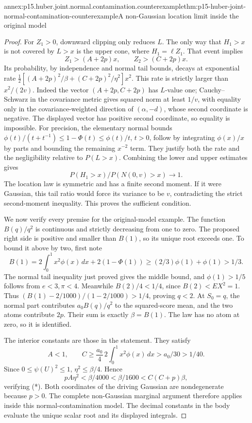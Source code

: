 \begin{annexitem}{annex:p15.huber.joint.normal.contamination.counterexample}{thm:p15-huber-joint-normal-contamination-counterexample}{A non-Gaussian location limit inside the original model}
\begin{proof}
For \(Z_1>0\), downward clipping only reduces \(L\).
The only way that \(H_1>x\) is not covered by \(L>x\) is the
upper cone, where \(H_1=\ell Z_1\). That event implies
\[
 Z_1>(A+2p)x,\qquad Z_2>(C+2p)x .
\]
Its probability, by independence and normal tail bounds, decays
at exponential rate
\(\frac12[(A+2p)^2/\beta+(C+2p)^2/\eta^2]x^2\).
This rate is strictly larger than \(x^2/(2v)\).
Indeed the vector \((A+2p,C+2p)\) has \(L\)-value one;
Cauchy--Schwarz in the covariance metric gives squared norm
at least \(1/v\), with equality only in the covariance-weighted
direction of \((\alpha,-d)\), whose second coordinate is negative.
The displayed vector has positive second coordinate, so equality
is impossible.
For precision, the elementary normal bounds
\(\phi(t)/(t+t^{-1})\leq1-\Phi(t)\leq\phi(t)/t\), \(t>0\),
follow by integrating \(\phi(x)/x\) by parts and bounding the
remaining \(x^{-2}\) term. They justify both the rate and the
negligibility relative to \(P(L>x)\).
Combining the lower and upper estimates gives
\[
                    P(H_1>x)/P(N(0,v)>x)\longrightarrow1.
\]
The location law is symmetric and has a finite second moment.
If it were Gaussian, this tail ratio would force its variance
to be \(v\), contradicting the strict second-moment inequality.
This proves the sufficient condition.

We now verify every premise for the original-model example.
The function \(B(q)/q^2\) is continuous and strictly decreasing
from one to zero. The proposed right side is positive and
smaller than \(B(1)\), so its unique root exceeds one.
To bound it above by two, first note
\[
 B(1)=2\int_0^1x^2\phi(x)\,dx+2(1-\Phi(1))
            \geq(2/3)\phi(1)+\phi(1)>1/3 .
\]
The normal tail inequality just proved gives the middle bound,
and \(\phi(1)>1/5\) follows from \(e<3,\pi<4\).
Meanwhile \(B(2)/4<1/4\), since \(B(2)<EX^2=1\).
Thus \((B(1)-2/1000)/(1-2/1000)>1/4\), proving \(q<2\).
At \(S_0=q\), the normal part contributes
\(a_0 B(q)/q^2\) to the squared-score mean, and the two atoms
contribute \(2p\). Their sum is exactly \(\beta=B(1)\).
The law has no atom at zero, so it is identified.

The interior constants are those in the statement. They satisfy
\[
 A<1,\qquad
 C\geq\frac{a_0}{4}\,2\int_0^1x^2\phi(x)\,dx
       >a_0/30>1/40.
\]
Since \(0\leq\psi(U)^2\leq1\),
\(\eta^2\leq\beta/4\). Hence
\[
 pA\eta^2<\beta/4000
           <\beta/1600<C(C+p)\beta ,
\]
verifying (*).
Both coordinates of the driving Gaussian are nondegenerate
because \(p>0\). The complete non-Gaussian marginal argument
therefore applies inside this normal-contamination model.
The decimal constants in the body evaluate the unique scalar
root and its displayed integrals.
\end{proof}
\end{annexitem}

